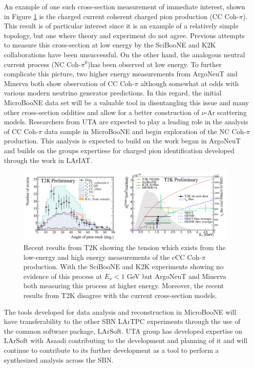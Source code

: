 An example of one such cross-section measurement of immediate interest, shown in Figure \ref{fig:cccohpion} is the charged current coherent charged pion production (CC Coh-$\pi$). This result is of particular interest since it is an example of a relatively simple topology, but one where theory and experiment do not agree. Previous attempts to measure this cross-section at low energy by the SciBooNE and K2K collaborations have been unsuccessful. On the other hand, the analogous neutral current process (NC Coh-$\pi^{0}$)has been observed at low energy. To further complicate this picture, two higher energy measurements from ArgoNeuT and Minerva both show observation of CC Coh-$\pi$ although somewhat at odds with various modern neutrino generator predictions. In this regard, the initial MicroBooNE data set will be a valuable tool in disentangling this issue and many other cross-section oddities and allow for a better construction of $\nu$-Ar scattering models. Researchers from UTA are expected to play a leading role in the analysis of CC Coh-$\pi$ data sample in MicroBooNE and begin exploration of the NC Coh-$\pi$ production. This analysis is expected to build on the work began in ArgoNeuT \cite{Argoneut} and builds on the groups expertiese for charged pion identification developed through the work in LArIAT.
 
\begin{figure}[htb]
\centering
\includegraphics[width=0.98\textwidth]{images/CCCohPion.png}
\caption[]{Recent results from T2K \cite{T2K} showing the tension which exists from the low-energy and high energy measurements of the cCC Coh-$\pi$ production. With the SciBooNE and K2K experiments showing no evidence of this process at $E_{\nu} < 1$ GeV but ArgoNeuT and Minerva both measuring this process at higher energy. Moreover, the recent results from T2K disagree with the current cross-section models.}
\label{fig:cccohpion}
\end{figure}


The tools developed for data analysis and reconstruction in MicroBooNE will have transferability to the other SBN LArTPC experiments through the use of the common software package, LArSoft. UTA group has developed expertise on LArSoft with Asaadi contributing to the development and planning of it and will continue to contribute to its further development as a tool to perform a synthesized analysis across the SBN.
